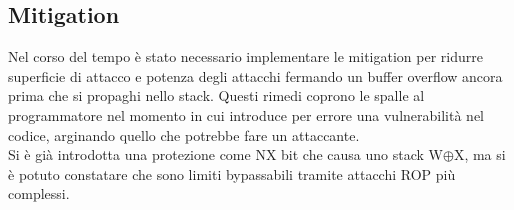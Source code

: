 \subsection*{Mitigation}

Nel corso del tempo è stato necessario implementare le mitigation per ridurre superficie di attacco e potenza degli attacchi fermando un buffer overflow ancora prima che si propaghi nello stack. Questi rimedi coprono le spalle al programmatore nel momento in cui introduce per errore una vulnerabilità nel codice, arginando quello che potrebbe fare un attaccante.\\
\newline
Si è già introdotta una protezione come NX bit che causa uno stack W$\oplus$X, ma si è potuto constatare che sono limiti bypassabili tramite attacchi ROP più complessi.


